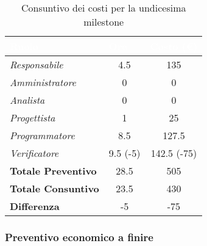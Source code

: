 \begin{table}[H]
    \renewcommand\arraystretch{1.5}
    \centering
    \begin{tabular}{|l|c|c|}
    \hline
    \rowcolor[HTML]{036400}
    \textcolor{white}{\textbf{Ruolo}} & \multicolumn{1}{l|}{\textcolor{white}{\textbf{Ore}}} & \multicolumn{1}{l|}{\textcolor{white}{\textbf{Costo (€)}}} \\ \hline
    \rowcolor[HTML]{EFEFEF}\textit{Responsabile}      & 4.5         & 135            \\ \hline
    \rowcolor[HTML]{C0C0C0}\textit{Amministratore}    & 0           & 0              \\ \hline
    \rowcolor[HTML]{EFEFEF}\textit{Analista}          & 0           & 0               \\ \hline
    \rowcolor[HTML]{C0C0C0}\textit{Progettista}       & 1           & 25      \\ \hline
    \rowcolor[HTML]{EFEFEF}\textit{Programmatore}     & 8.5         & 127.5        \\ \hline
    \rowcolor[HTML]{C0C0C0}\textit{Verificatore}      & 9.5 (-5)    & 142.5 (-75)   \\ \hline
    \rowcolor[HTML]{EFEFEF}\textbf{Totale Preventivo} & 28.5        & 505          \\ \hline
    \rowcolor[HTML]{C0C0C0}\textbf{Totale Consuntivo} & 23.5        & 430            \\ \hline
    \rowcolor[HTML]{EFEFEF}\textbf{Differenza}        & -5          & -75            \\ \hline
    \end{tabular}
    \caption{Consuntivo dei costi per la undicesima milestone}
\end{table}

\subsubsection{Preventivo economico a finire}

